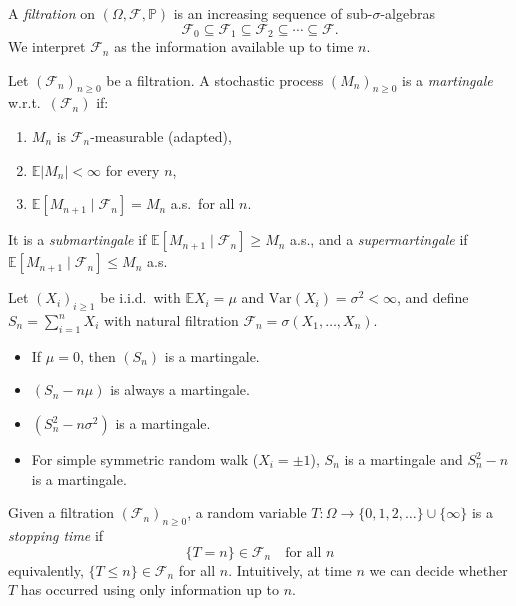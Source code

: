\documentclass[answers,12pt,addpoints]{exam}
\begin{document}
\begin{definition}[Filtration]
A \emph{filtration} on $(\Omega,\mathcal{F},\mathbb{P})$ is an increasing sequence of sub-$\sigma$-algebras
\[
\mathcal{F}_0 \subseteq \mathcal{F}_1 \subseteq \mathcal{F}_2 \subseteq \cdots \subseteq \mathcal{F}.
\]
We interpret $\mathcal{F}_n$ as the information available up to time $n$.
\end{definition}

\begin{definition}
Let $(\mathcal{F}_n)_{n\ge 0}$ be a filtration. A stochastic process $(M_n)_{n\ge 0}$ is a \emph{martingale} w.r.t.\ $(\mathcal{F}_n)$ if:
\begin{enumerate}
\item $M_n$ is $\mathcal{F}_n$-measurable (adapted),
\item $\mathbb{E}|M_n|<\infty$ for every $n$,
\item $\mathbb{E}[M_{n+1}\mid \mathcal{F}_n] = M_n$ a.s.\ for all $n$.
\end{enumerate}
It is a \emph{submartingale} if $\mathbb{E}[M_{n+1}\mid \mathcal{F}_n]\ge M_n$ a.s., and a \emph{supermartingale} if $\mathbb{E}[M_{n+1}\mid \mathcal{F}_n]\le M_n$ a.s.
\end{definition}

\begin{example}
Let $(X_i)_{i\ge 1}$ be i.i.d.\ with $\mathbb{E}X_i = \mu$ and $\mathrm{Var}(X_i)=\sigma^2<\infty$, and define $S_n = \sum_{i=1}^n X_i$ with natural filtration $\mathcal{F}_n = \sigma(X_1,\dots,X_n)$.
\begin{itemize}
\item If $\mu=0$, then $(S_n)$ is a martingale.
\item $(S_n - n\mu)$ is always a martingale.
\item $(S_n^2 - n\sigma^2)$ is a martingale.
\item For simple symmetric random walk ($X_i=\pm 1$), $S_n$ is a martingale and $S_n^2-n$ is a martingale.
\end{itemize}
\end{example}

\begin{definition}
Given a filtration $(\mathcal{F}_n)_{n\ge 0}$, a random variable $T:\Omega\to\{0,1,2,\dots\}\cup\{\infty\}$ is a \emph{stopping time} if
\[
\{T = n\}\in \mathcal{F}_n \quad \text{for all }n
\]
equivalently, $\{T\le n\}\in\mathcal{F}_n$ for all $n$. Intuitively, at time $n$ we can decide whether $T$ has occurred using only information up to $n$.
\end{definition}
\end{document}
